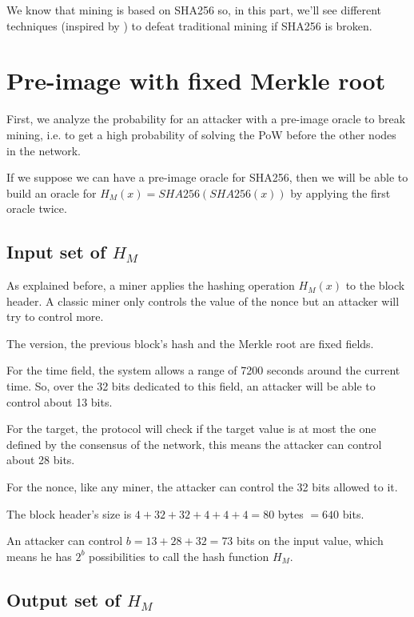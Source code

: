 We know that mining is based on SHA256 so, in this part, we'll see different techniques (inspired by \cite{broken_crypto_primitives}) to defeat traditional mining if SHA256 is broken.

\section{Pre-image with fixed Merkle root}

First, we analyze the probability for an attacker with a pre-image oracle to break mining, i.e. to get a high probability of solving the PoW before the other nodes in the network.

If we suppose we can have a pre-image oracle for SHA256, then we will be able to build an oracle for $H_M(x) = SHA256(SHA256(x))$ by applying the first oracle twice.

	\subsection{Input set of $H_M$}

As explained before, a miner applies the hashing operation $H_M(x)$ to the block header. A classic miner only controls the value of the nonce but an attacker will try to control more. \newline

The version, the previous block's hash and the Merkle root are fixed fields. \newline

For the time field, the system allows a range of 7200 seconds around the current time. So, over the 32 bits dedicated to this field, an attacker will be able to control about 13 bits.

For the target, the protocol will check if the target value is at most the one defined by the consensus of the network, this means the attacker can control about 28 bits.

For the nonce, like any miner, the attacker can control the 32 bits allowed to it. \newline

The block header's size is $4 + 32 + 32 + 4 + 4 + 4 = 80$ bytes $ = 640$ bits.

An attacker can control $b = 13 + 28 + 32 = 73$ bits on the input value, which means he has $2^b$ possibilities to call the hash function $H_M$.

	\subsection{Output set of $H_M$}

